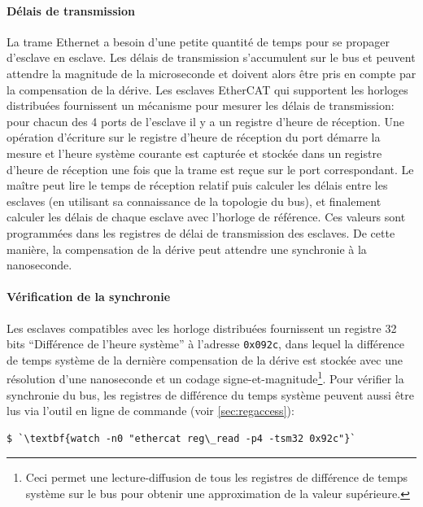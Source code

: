 \documentclass[a4paper,12pt,BCOR=6mm,bibtotoc,idxtotoc]{scrbook}
\begin{document}
\paragraph{D\'elais de transmission} La trame Ethernet a besoin
d'une petite quantit\'e de temps pour se propager d'esclave en
esclave.  Les d\'elais de transmission s'accumulent sur le bus et
peuvent attendre la magnitude de la microseconde et doivent alors
\^etre pris en compte par la compensation de la d\'erive.  Les
esclaves EtherCAT qui supportent les horloges distribu\'ees
fournissent un m\'ecanisme pour mesurer les d\'elais de transmission:
pour chacun des 4 ports de l'esclave il y a un registre d'heure de
r\'eception.  Une op\'eration d'\'ecriture sur le registre d'heure de
r\'eception du port d\'emarre la mesure et l'heure syst\`eme courante
est captur\'ee et stock\'ee dans un registre d'heure de r\'eception
une fois que la trame est re\c{c}ue sur le port correspondant.  Le
ma\^itre peut lire le temps de r\'eception relatif puis calculer les
d\'elais entre les esclaves (en utilisant sa connaissance de la
topologie du bus), et finalement calculer les d\'elais de chaque
esclave avec l'horloge de r\'ef\'erence.  Ces valeurs sont
programm\'ees dans les registres de d\'elai de transmission des
esclaves. De cette mani\`ere, la compensation de la d\'erive peut
attendre une synchronie \`a la nanoseconde.

\paragraph{V\'erification de la synchronie}
Les esclaves compatibles avec les horloge distribu\'ees fournissent un
registre 32 bits ``Diff\'erence de l'heure syst\`eme'' \`a l'adresse
\lstinline+0x092c+, dans lequel la diff\'erence de temps syst\`eme de
la derni\`ere compensation de la d\'erive est stock\'ee avec une
r\'esolution d'une nanoseconde et un codage
signe-et-magnitude\footnote{Ceci permet une lecture-diffusion de tous
les registres de diff\'erence de temps syst\`eme sur le bus pour
obtenir une approximation de la valeur sup\'erieure.}. Pour v\'erifier
la synchronie du bus, les registres de diff\'erence du temps syst\`eme
peuvent aussi \^etre lus via l'outil en ligne de commande (voir
\autoref{sec:regaccess}):

\begin{lstlisting}
$ `\textbf{watch -n0 "ethercat reg\_read -p4 -tsm32 0x92c"}`
\end{lstlisting}
\end{document}
